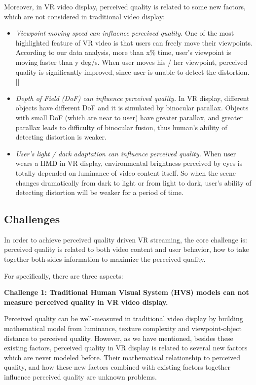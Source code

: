 Moreover, in VR video display, perceived quality is related to some new factors, which are not considered in traditional video display:

\begin{itemize}

\item \emph{Viewpoint moving speed can influence perceived quality.} One of the most highlighted feature of VR video is that users can freely move their viewpoints. According to our data analysis, more than x\% time, user's viewpoint is moving faster than y deg/s. When user moves his / her viewpoint, perceived quality is significantly improved, since user is unable to detect the distortion. []

\item \emph{Depth of Field (DoF) can influence perceived quality.} In VR display, different objects have different DoF and it is simulated by binocular parallax. Objects with small DoF (which are near to user) have greater parallax, and greater parallax leads to difficulty of binocular fusion, thus human's ability of detecting distortion is weaker.

\item \emph{User's light / dark adaptation can influence perceived quality.} When user wears a HMD in VR display, environmental brightness perceived by eyes is totally depended on luminance of video content itself. So when the scene changes dramatically from dark to light or from light to dark, user's ability of detecting distortion will be weaker for a period of time.

\end{itemize}

\subsection{Challenges}
In order to achieve perceived quality driven VR streaming, the core challenge is: perceived quality is related to both video content and user behavior, how to take together both-sides information to maximize the perceived quality. 

For specifically, there are three aspects:

\textbf{Challenge 1: Traditional Human Visual System (HVS) models can not measure perceived quality in VR video display.} 

Perceived quality can be well-measured in traditional video display by building mathematical model from luminance, texture complexity and viewpoint-object distance to perceived quality. However, as we have mentioned, besides these existing factors, perceived quality in VR display is related to several new factors which are never modeled before. Their mathematical relationship to perceived quality, and how these new factors combined with existing factors together influence perceived quality are unknown problems.

